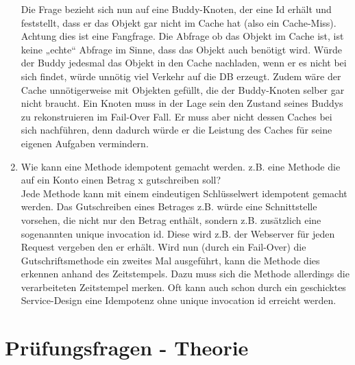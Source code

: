 \documentclass[a4paper,10pt]{scrreprt}
\begin{document}
\begin{enumerate}
Die Frage bezieht sich nun auf eine Buddy-Knoten, der eine Id erhält und feststellt, dass er das
Objekt gar nicht im Cache hat (also ein Cache-Miss). Achtung dies ist eine Fangfrage. Die Abfrage ob
das Objekt im Cache ist, ist keine „echte“ Abfrage im Sinne, dass das Objekt auch benötigt wird.
Würde der Buddy jedesmal das Objekt in den Cache nachladen, wenn er es nicht bei sich findet,
würde unnötig viel Verkehr auf die DB erzeugt. Zudem wäre der Cache unnötigerweise mit Objekten
gefüllt, die der Buddy-Knoten selber gar nicht braucht. Ein Knoten muss in der Lage sein den Zustand
seines Buddys zu rekonstruieren im Fail-Over Fall. Er muss aber nicht dessen Caches bei sich
nachführen, denn dadurch würde er die Leistung des Caches für seine eigenen Aufgaben
vermindern.
\item  Wie kann eine Methode idempotent gemacht werden. z.B. eine Methode die auf ein Konto einen
Betrag x gutschreiben soll?\\
Jede Methode kann mit einem eindeutigen Schlüsselwert idempotent gemacht werden. Das
Gutschreiben eines Betrages z.B. würde eine Schnittstelle vorsehen, die nicht nur den Betrag enthält,
sondern z.B. zusätzlich eine sogenannten unique invocation id. Diese wird z.B. der Webserver für
jeden Request vergeben den er erhält. Wird nun (durch ein Fail-Over) die Gutschriftsmethode ein
zweites Mal ausgeführt, kann die Methode dies erkennen anhand des Zeitstempels. Dazu muss sich
die Methode allerdings die verarbeiteten Zeitstempel merken.
Oft kann auch schon durch ein geschicktes Service-Design eine Idempotenz ohne unique invocation
id erreicht werden.
\end{enumerate}

\chapter{Prüfungsfragen - Theorie} %
\label{cha:pr_fungsfragen_theorie}
\end{document}
